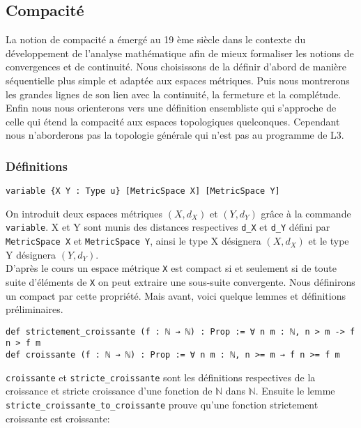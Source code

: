\documentclass[a4paper, 12pt]{article}
\newcommand{\lean}[1]{\texttt{#1}}
\begin{document}
\subsection{Compacité}

La notion de compacité a émergé au 19 ème siècle dans le contexte du développement de l'analyse mathématique afin de mieux formaliser les notions de convergences et de continuité. Nous choisissons de la définir d'abord de manière séquentielle plus simple et adaptée aux espaces métriques. Puis nous montrerons les grandes lignes de son lien avec la continuité, la fermeture et la complétude. Enfin nous nous orienterons vers une définition ensembliste qui s'approche de celle qui étend la compacité aux espaces topologiques quelconques. Cependant nous n'aborderons pas la topologie générale qui n'est pas au programme de L3.


\subsubsection{Définitions}

\begin{verbatim}
variable {X Y : Type u} [MetricSpace X] [MetricSpace Y]
\end{verbatim}

On introduit deux espaces métriques $(X,d_{X})$ et $(Y,d_{Y})$ grâce à la commande \lean{variable}. X et Y sont munis des distances respectives \lean{d_{X}} et \lean{d_{Y}} défini par \lean{MetricSpace X} et \lean{MetricSpace Y}, ainsi le type X désignera $(X,d_{X})$ et le type Y désignera $(Y,d_{Y})$.\\

D'après le cours un espace métrique \lean{X} est compact si et seulement si de toute suite d'éléments de \lean{X} on peut extraire une sous-suite convergente. Nous définirons un compact par cette propriété. Mais avant, voici quelque lemmes et définitions préliminaires.

\begin{verbatim}
def strictement_croissante (f : ℕ → ℕ) : Prop := ∀ n m : ℕ, n > m -> f n > f m
def croissante (f : ℕ → ℕ) : Prop := ∀ n m : ℕ, n >= m → f n >= f m
\end{verbatim}

\lean{croissante} et \lean{stricte_croissante} sont les définitions respectives de la croissance et stricte croissance d'une fonction de $\mathbb{N}$ dans $\mathbb{N}$. Ensuite le lemme \lean{stricte_croissante_to_croissante} prouve qu'une fonction strictement croissante est croissante:
\end{document}

